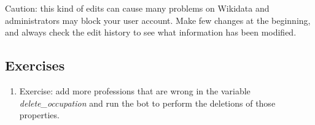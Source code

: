 Caution: this kind of edits can cause many problems on Wikidata and administrators may block your user account. Make few changes at the beginning, and always check the edit history to see what information has been modified.
\subsection{Exercises}

\begin{enumerate} 
\item Exercise: add more professions that are wrong in the variable \textit{delete\_occupation} and run the bot to perform the deletions of those properties.
\end{enumerate}
